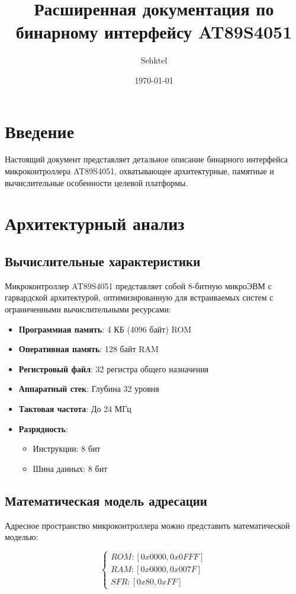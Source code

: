 \documentclass{article}
\title{Расширенная документация по бинарному интерфейсу AT89S4051}
\author{Sehktel}
\date{\today}
\begin{document}
\maketitle

\section{Введение}
Настоящий документ представляет детальное описание бинарного интерфейса микроконтроллера AT89S4051, охватывающее архитектурные, памятные и вычислительные особенности целевой платформы.

\section{Архитектурный анализ}
\subsection{Вычислительные характеристики}
Микроконтроллер AT89S4051 представляет собой 8-битную микроЭВМ с гарвардской архитектурой, оптимизированную для встраиваемых систем с ограниченными вычислительными ресурсами:

\begin{itemize}
    \item \textbf{Программная память}: 4 КБ (4096 байт) ROM
    \item \textbf{Оперативная память}: 128 байт RAM
    \item \textbf{Регистровый файл}: 32 регистра общего назначения
    \item \textbf{Аппаратный стек}: Глубина 32 уровня
    \item \textbf{Тактовая частота}: До 24 МГц
    \item \textbf{Разрядность}: 
        \begin{itemize}
            \item Инструкции: 8 бит
            \item Шина данных: 8 бит
        \end{itemize}
\end{itemize}

\subsection{Математическая модель адресации}
Адресное пространство микроконтроллера можно представить математической моделью:

\[ 
\begin{cases} 
ROM: [0x0000, 0x0FFF] \\
RAM: [0x0000, 0x007F] \\
SFR: [0x80, 0xFF]
\end{cases}
\]
\end{document}
